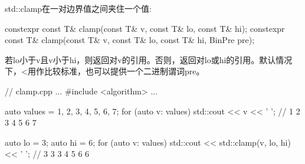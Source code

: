 std::clamp在一对边界值之间夹住一个值:

\begin{cpp}
constexpr const T& clamp(const T& v, const T& lo, const T& hi);
constexpr const T& clamp(const T& v, const T& lo, const T& hi, BinPre pre);
\end{cpp}

若lo小于v且v小于hi，则返回对v的引用。否则，返回对lo或hi的引用。默认情况下，<用作比较标准，也可以提供一个二进制谓词pre。


\begin{cpp}
// clamp.cpp
...
#include <algorithm>
...

auto values = {1, 2, 3, 4, 5, 6, 7};
for (auto v: values) std::cout << v << ' '; // 1 2 3 4 5 6 7

auto lo = 3;
auto hi = 6;
for (auto v: values) std::cout << std::clamp(v, lo, hi) << ' '; // 3 3 3 4 5 6 6
\end{cpp}






















